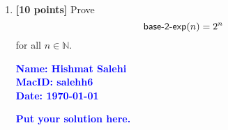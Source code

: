 \documentclass[11pt,fleqn]{article}
\newcommand{\mname}[1]{\mbox{\sf #1}}
\begin{document}
\begin{enumerate}
\begin{proof}
\medskip

Therefore, $P(n)$ holds for all $n \in \mathbb{N}$ by weak induction.
\end{proof}

  \bigskip

  \item \textbf{[10 points]} Prove \[\mname{base-2-exp}(n) = 2^n\] for
    all $n \in \mathbb{N}$.

  \bigskip

  \textcolor{blue}{\textbf{Name: Hishmat Salehi \\ MacID: salehh6 \\ Date: \today}}

  \textcolor{blue}{\textbf{Put your solution here.}}

\end{enumerate}
\end{document}
